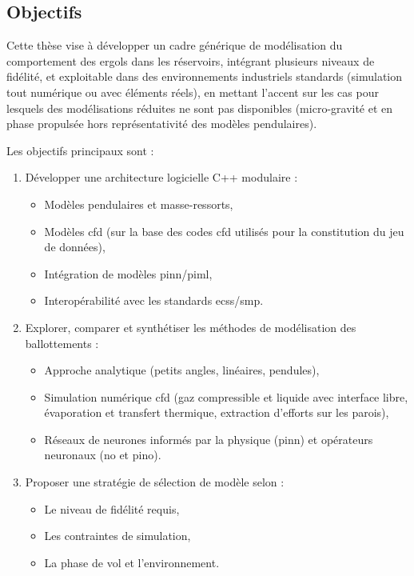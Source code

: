 \documentclass[12pt]{article}
\begin{document}
	\subsection*{Objectifs}
	
	Cette thèse vise à développer un cadre générique de modélisation du comportement des ergols dans les réservoirs, intégrant plusieurs niveaux de fidélité, et exploitable dans des environnements industriels standards (simulation tout numérique ou avec éléments réels), en mettant l'accent sur les cas pour lesquels des modélisations réduites ne sont pas disponibles (micro-gravité et en phase propulsée hors représentativité des modèles pendulaires).
	
	Les objectifs principaux sont :
	\begin{enumerate}
		\item Développer une architecture logicielle C++ modulaire :
		\begin{itemize}
			\item Modèles pendulaires et masse-ressorts,
			\item Modèles \acrshort{cfd} (sur la base des codes \acrshort{cfd} utilisés pour la constitution du jeu de données),
			\item Intégration de modèles \gls{pinn}/\acrshort{piml},
			\item Interopérabilité avec les standards \acrshort{ecss}/\acrshort{smp}.
		\end{itemize}
		\item Explorer, comparer et synthétiser les méthodes de modélisation des ballottements :
		\begin{itemize}
			\item Approche analytique (petits angles, linéaires, pendules),
			\item Simulation numérique \acrshort{cfd} (gaz compressible et liquide avec interface libre, évaporation et transfert thermique, extraction d'efforts sur les parois),
			\item Réseaux de neurones informés par la physique (\gls{pinn}) et opérateurs neuronaux (\acrshort{no} et \acrshort{pino}).
		\end{itemize}
		\item Proposer une stratégie de sélection de modèle selon :
		\begin{itemize}
			\item Le niveau de fidélité requis,
			\item Les contraintes de simulation,
			\item La phase de vol et l'environnement.
		\end{itemize}
	\end{enumerate}
	
\end{document}
